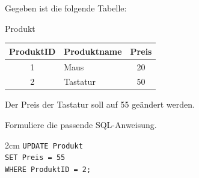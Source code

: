 \question[3]
Gegeben ist die folgende Tabelle:

Produkt \medskip

\begin{tabular}{|c|l|c|}
\hline
ProduktID & Produktname & Preis \\
\hline
1 & Maus & 20 \\
2 & Tastatur & 50 \\
\hline
\end{tabular}


Der Preis der Tastatur soll auf 55 geändert werden.

Formuliere die passende SQL-Anweisung.

\begin{solutionbox}{2cm}
\texttt{UPDATE Produkt}\\
\texttt{SET Preis = 55}\\
\texttt{WHERE ProduktID = 2;}
\end{solutionbox}